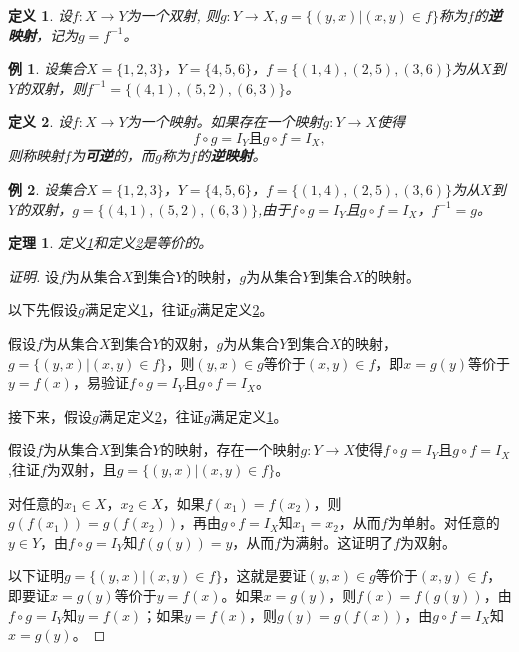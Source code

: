 \documentclass{article}
\newtheorem{Def}{定义}
\newtheorem{Thm}{定理}
\newtheorem*{Example}{例}
\begin{document}
\begin{CJK*}{UTF8}{gbsn}
   \begin{Def}\label{inverse1}
          设$f:X\to Y$为一个双射, 则$g:Y\to X, g=\{(y,x)|(x,y)\in f\}$称为$f$的{\bfseries 逆映射}，记为$g=f^{-1}$。
   \end{Def}
   \begin{Example}
     设集合$X=\{1,2,3\}$，$Y=\{4,5,6\}$，$f=\{(1,4),(2,5),(3,6)\}$为从$X$到$Y$的双射，则$f^{-1}=\{(4,1),(5,2),(6,3)\}$。
   \end{Example}
    \begin{Def}\label{inverse2}
     设$f:X\to Y$为一个映射。如果存在一个映射$g:Y\to X$使得\[f\circ g = I_{Y} \text{且} g\circ f = I_{X},\]则称映射$f$为{\bfseries 可逆}的，而$g$称为$f$的{\bfseries 逆映射}。
   \end{Def}
      \begin{Example}
     设集合$X=\{1,2,3\}$，$Y=\{4,5,6\}$，$f=\{(1,4),(2,5),(3,6)\}$为从$X$到$Y$的双射，$g=\{(4,1),(5,2),(6,3)\}$,由于$f\circ g = I_{Y}$且$ g\circ f = I_{X}$，$f^{-1}=g$。
   \end{Example}
\begin{Thm}
   定义\ref{inverse1}和定义\ref{inverse2}是等价的。
 \end{Thm}
 \begin{proof}[证明]
   设$f$为从集合$X$到集合$Y$的映射，$g$为从集合$Y$到集合$X$的映射。

   以下先假设$g$满足定义\ref{inverse1}，往证$g$满足定义\ref{inverse2}。

   假设$f$为从集合$X$到集合$Y$的双射，$g$为从集合$Y$到集合$X$的映射，$g=\{(y,x)|(x,y)\in f\}$，则$(y,x)\in g$等价于$(x,y)\in f$，即$x=g(y)$等价于$y=f(x)$，易验证$f\circ g = I_{Y}$且$g\circ f = I_{X}$。

   接下来，假设$g$满足定义\ref{inverse2}，往证$g$满足定义\ref{inverse1}。

   假设$f$为从集合$X$到集合$Y$的映射，存在一个映射$g:Y\to X$使得$f\circ g = I_{Y}$且$g\circ f = I_{X}$,往证$f$为双射，且$g=\{(y,x)|(x,y)\in f\}$。

   对任意的$x_1\in X$，$x_2\in X$，如果$f(x_1)=f(x_2)$，则$g(f(x_1))=g(f(x_2))$，再由$g\circ f = I_{X}$知$x_1=x_2$，从而$f$为单射。对任意的$y\in Y$，由$f\circ g = I_{Y}$知$f(g(y))=y$，从而$f$为满射。这证明了$f$为双射。

   以下证明$g=\{(y,x)|(x,y)\in f\}$，这就是要证$(y,x)\in g$等价于$(x,y)\in f$，即要证$x=g(y)$等价于$y=f(x)$。如果$x=g(y)$，则$f(x)=f(g(y))$，由$f\circ g=I_Y$知$y=f(x)$；如果$y=f(x)$，则$g(y)=g(f(x))$，由$g\circ f=I_X$知$x=g(y)$。



\end{proof}
\end{CJK*}
\end{document}
